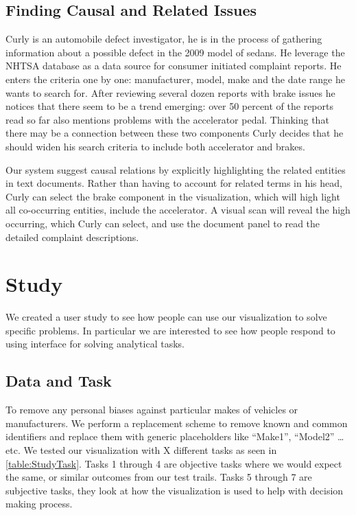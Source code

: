 \subsection{Finding Causal and Related Issues}
Curly is an automobile defect investigator, he is in the process of gathering
information about a possible defect in the 2009 model of sedans. He leverage the
NHTSA database as a data source for consumer initiated complaint reports. He
enters the criteria one by one: manufacturer, model, make and the date range he
wants to search for. After reviewing several dozen reports with brake issues he
notices that there seem to be a trend emerging: over 50 percent of the reports
read so far also mentions problems with the accelerator pedal. Thinking that
there may be a connection between these two components Curly decides that he
should widen his search criteria to include both accelerator and brakes.

Our system suggest causal relations by explicitly highlighting the related
entities in text documents. Rather than having to account for related terms in
his head, Curly can select the brake component in the visualization, which will
high light all co-occurring entities, include the accelerator. A visual scan
will reveal the high occurring, which Curly can select, and use the document
panel to read the detailed complaint descriptions.


\section{Study}
We created a user study to see how people can use our visualization to solve
specific problems. In particular we are interested to see how people respond to
using \threed interface for solving analytical tasks.

\subsection{Data and Task}
To remove any personal biases against particular makes of vehicles or
manufacturers. We perform a replacement scheme to remove known and common
identifiers and replace them with generic placeholders like ``Make1'',
``Model2'' \ldots etc. We tested our visualization with X different tasks as
seen in \ref{table:StudyTask}. Tasks 1 through 4 are objective tasks where we
would expect the same, or similar outcomes from our test trails. Tasks 5 through
7 are subjective tasks, they look at how the visualization is used to help with
decision making process.

